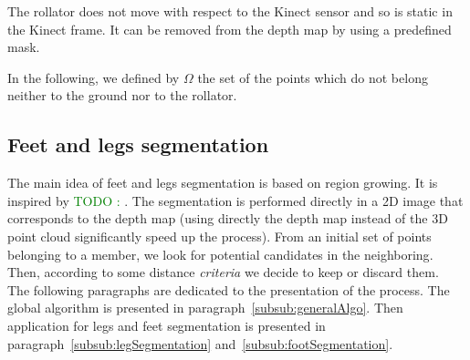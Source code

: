 \documentclass[letterpaper, 10 pt, conference]{ieeeconf}
\newcommand{\TODO}[1]{\textcolor{green}{TODO : #1}} %
\newcommand{\CDOK}[2]{{#1}} %
\begin{document}
The rollator does not move with respect to the Kinect sensor and so is static in the Kinect frame. It can be removed from the depth map by using a predefined mask.

In the following, we defined by $\Omega$ the set of the points which do not belong neither to the ground nor to the rollator. 


\subsection{Feet and legs segmentation}

The main idea of feet and legs segmentation is based on region growing. It is inspired by \TODO{\cite{aaa}}. \CDOK{The segmentation is performed directly in a 2D image that corresponds to the depth map (using directly the depth map instead of the 3D point cloud significantly speed up the process)}{}. From \CDOK{an initial}{a current} set of points \CDOK{belonging to}{of} a member, we look for potential candidates in the neighboring\CDOK{. Then, according to some distance \textit{criteria} we decide to keep or discard them. \\}{ and then validate it or not. } The following paragraphs are dedicated to the presentation of the process. The global algorithm is presented in paragraph~\ref{subsub:generalAlgo}. Then application for legs and feet segmentation is presented in paragraph~\ref{subsub:legSegmentation} and~\ref{subsub:footSegmentation}.
\end{document}
